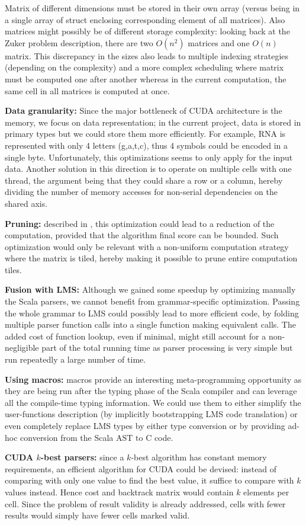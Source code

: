 \documentclass[11pt]{article}
\begin{document}
Matrix of different dimensions must be stored in their own array (versus being in a single array of struct enclosing corresponding element of all matrices). Also matrices might possibly be of different storage complexity: looking back at the Zuker problem description, there are two $O(n^2)$ matrices and one $O(n)$ matrix. This discrepancy in the sizes also leads to multiple indexing strategies (depending on the complexity) and a more complex scheduling where matrix must be computed one after another whereas in the current computation, the same cell in all matrices is computed at once. 
\item \textbf{Data granularity:} Since the major bottleneck of CUDA architecture is the memory, we focus on data representation; in the current project, data is stored in primary types but we could store them more efficiently. For example, RNA is represented with only 4 letters (g,a,t,c), thus 4 symbols could be encoded in a single byte. Unfortunately, this optimizations seems to only apply for the input data. Another solution in this direction is to operate on multiple cells with one thread, the argument being that they could share a row or a column, hereby dividing the number of memory accesses for non-serial dependencies on the shared axis.
\item \textbf{Pruning:} described in \cite{swat_mega}, this optimization could lead to a reduction of the computation, provided that the algorithm final score can be bounded. Such optimization would only be relevant with a non-uniform computation strategy where the matrix is tiled, hereby making it possible to prune entire computation tiles.
\item \textbf{Fusion with LMS:} Although we gained some speedup by optimizing manually the Scala parsers, we cannot benefit from grammar-specific optimization. Passing the whole grammar to LMS could possibly lead to more efficient code, by folding multiple parser function calls into a single function making equivalent calls. The added cost of function lookup, even if minimal, might still account for a non-negligible part of the total running time as parser processing is very simple but run repeatedly a large number of time.
\item \textbf{Using macros:} macros provide an interesting meta-programming opportunity as they are being run after the typing phase of the Scala compiler and can leverage all the compile-time typing information. We could use them to either simplify the user-functions description (by implicitly bootstrapping LMS code translation) or even completely replace LMS types by either type conversion or by providing ad-hoc conversion from the Scala AST to C code.
\item \textbf{CUDA $k$-best parsers:} since a $k$-best algorithm has constant memory requirements, an efficient algorithm for CUDA could be devised: instead of comparing with only one value to find the best value, it suffice to compare with $k$ values instead. Hence cost and backtrack matrix would contain $k$ elements per cell. Since the problem of result validity is already addressed, cells with fewer results would simply have fewer cells marked valid.
\ole
\end{document}
